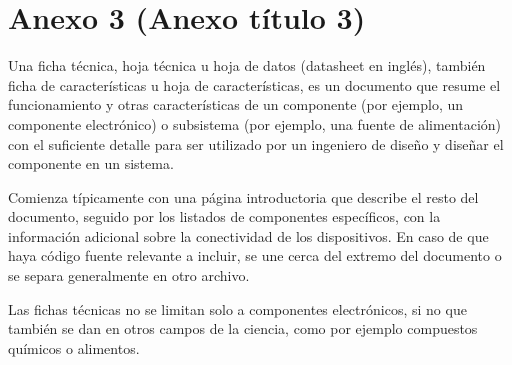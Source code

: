 \chapter{Anexo 3 (Anexo título 3)}\label{anexo3}

Una ficha técnica, hoja técnica u hoja de datos (datasheet en inglés), también ficha de características u hoja de características, es un documento que resume el funcionamiento y otras características de un componente (por ejemplo, un componente electrónico) o subsistema (por ejemplo, una fuente de alimentación) con el suficiente detalle para ser utilizado por un ingeniero de diseño y diseñar el componente en un sistema.

Comienza típicamente con una página introductoria que describe el resto del documento, seguido por los listados de componentes específicos, con la información adicional sobre la conectividad de los dispositivos. En caso de que haya código fuente relevante a incluir, se une cerca del extremo del documento o se separa generalmente en otro archivo.

Las fichas técnicas no se limitan solo a componentes electrónicos, si no que también se dan en otros campos de la ciencia, como por ejemplo compuestos químicos o alimentos.






\endinput 